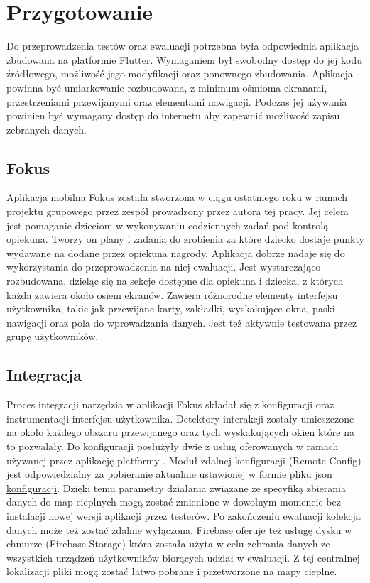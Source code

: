 \section{Przygotowanie}
Do przeprowadzenia testów oraz ewaluacji potrzebna była odpowiednia aplikacja zbudowana na platformie Flutter. Wymaganiem był swobodny dostęp do jej kodu źródłowego, możliwość jego modyfikacji oraz ponownego zbudowania. Aplikacja powinna być umiarkowanie rozbudowana, z minimum ośmioma ekranami, przestrzeniami przewijanymi oraz elementami nawigacji. Podczas jej używania powinien być wymagany dostęp do internetu aby zapewnić możliwość zapisu zebranych danych. 

\subsection{Fokus}
Aplikacja mobilna Fokus została stworzona w ciągu ostatniego roku w ramach projektu grupowego przez zespół prowadzony przez autora tej pracy. Jej celem jest pomaganie dzieciom w wykonywaniu codziennych zadań pod kontrolą opiekuna. Tworzy on plany i zadania do zrobienia za które dziecko dostaje punkty wydawane na dodane przez opiekuna nagrody. Aplikacja dobrze nadaje się do wykorzystania do przeprowadzenia na niej ewaluacji. Jest wystarczająco rozbudowana, dzieląc się na sekcje dostępne dla opiekuna i dziecka, z których każda zawiera około osiem ekranów. Zawiera różnorodne elementy interfejsu użytkownika, takie jak przewijane karty, zakładki, wyskakujące okna, paski nawigacji oraz pola do wprowadzania danych. Jest też aktywnie testowana przez grupę użytkowników.

\subsection{Integracja}
Proces integracji narzędzia w aplikacji Fokus składał się z konfiguracji oraz instrumentacji interfejsu użytkownika. Detektory interakcji zostały umieszczone na około każdego obszaru przewijanego oraz tych wyskakujących okien które na to pozwalały. Do konfiguracji posłużyły dwie z usług oferowanych w ramach używanej przez aplikację platformy . Moduł zdalnej konfiguracji (Remote Config) jest odpowiedzialny za pobieranie aktualnie ustawionej w formie pliku json \hyperref[sec:rs_config]{konfiguracji}. Dzięki temu parametry działania związane ze specyfiką zbierania danych do map cieplnych mogą zostać zmienione w dowolnym momencie bez instalacji nowej wersji aplikacji przez testerów. Po zakończeniu ewaluacji kolekcja danych może też zostać zdalnie wyłączona. Firebase oferuje też usługę dysku w chmurze (Firebase Storage) która została użyta w celu zebrania danych ze wszystkich urządzeń użytkowników biorących udział w ewaluacji. Z tej centralnej lokalizacji pliki mogą zostać łatwo pobrane i przetworzone na mapy cieplne.
